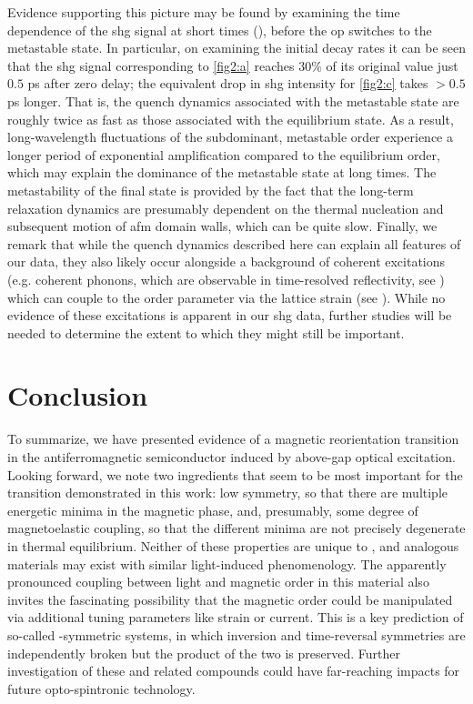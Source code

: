 Evidence supporting this picture may be found by examining the time dependence of the \gls{shg} signal at short times (), before the \gls{op} switches to the metastable state.
In particular, on examining the initial decay rates it can be seen that the \gls{shg} signal corresponding to \cref{fig2:a} reaches $30\%$ of its original value just $0.5$ \si{ps} after zero delay; the equivalent drop in \gls{shg} intensity for \cref{fig2:c} takes $> 0.5$ \si{ps} longer.
That is, the quench dynamics associated with the metastable state are roughly twice as fast as those associated with the equilibrium state.
As a result, long-wavelength fluctuations of the subdominant, metastable order experience a longer period of exponential amplification compared to the equilibrium order, which may explain the dominance of the metastable state at long times.
The metastability of the final state is provided by the fact that the long-term relaxation dynamics are presumably dependent on the thermal nucleation and subsequent motion of \gls{afm} domain walls, which can be quite slow\citep{parkin_memory_2015,kim_real-space_2022}.
Finally, we remark that while the quench dynamics described here can explain all features of our data, they also likely occur alongside a background of coherent excitations (e.g. coherent phonons, which are observable in time-resolved reflectivity, see ) which can couple to the order parameter via the lattice strain (see ).
While no evidence of these excitations is apparent in our \gls{shg} data, further studies will be needed to determine the extent to which they might still be important.

\section{Conclusion}

To summarize, we have presented evidence of a magnetic reorientation transition in the antiferromagnetic semiconductor \cmb induced by above-gap optical excitation.
Looking forward, we note two ingredients that seem to be most important for the transition demonstrated in this work: low symmetry, so that there are multiple energetic minima in the magnetic phase, and, presumably, some degree of magnetoelastic coupling, so that the different minima are not precisely degenerate in thermal equilibrium.
Neither of these properties are unique to \cmb, and analogous materials may exist with similar light-induced phenomenology. 
The apparently pronounced coupling between light and magnetic order in this material also invites the fascinating possibility that the magnetic order could be manipulated via additional tuning parameters like strain or current.
This is a key prediction of so-called \pt-symmetric systems, in which inversion and time-reversal symmetries are independently broken but the product of the two is preserved\citep{watanabe_group-theoretical_2018, watanabe_nonlinear_2020, watanabe_symmetry_2018}.
Further investigation of these and related compounds could have far-reaching impacts for future opto-spintronic technology.

